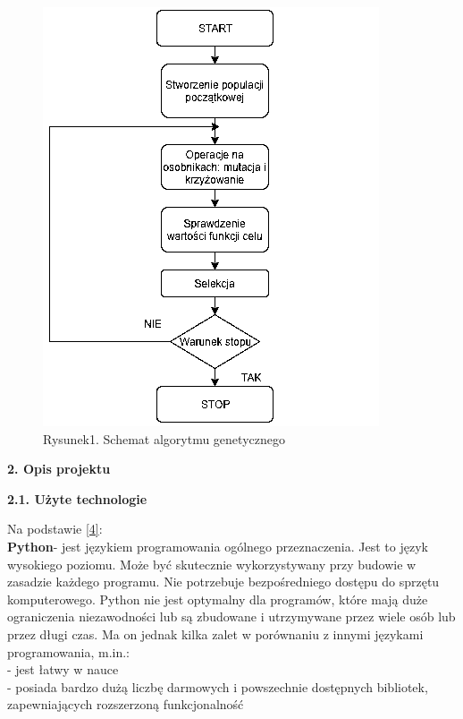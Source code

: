 \documentclass[a4paper, twoside, 12pt, justified]{article}
\begin{document}
	\vspace{10mm}
	
	
	\begin{figure}[h]
	\includegraphics[scale=0.8]{ag}
	\centering
	\\
	{Rysunek1. Schemat algorytmu genetycznego} 
	\end{figure}
	
	
	
	\newpage
	\begin{flushleft}
		\begin{large}
			\textbf{2. Opis projektu}
		\end{large}
	\end{flushleft}
	
	\vspace{5mm} %
	
	\begin{flushleft}
		\begin{large}
			\textbf{2.1. Użyte technologie}
		\end{large}
	\end{flushleft}
	\vspace{10mm} %
	
	 Na podstawie \hyperlink{python}{[4]}:\\
	 \textbf{Python}- jest językiem programowania ogólnego przeznaczenia. Jest to język wysokiego poziomu. Może być skutecznie wykorzystywany przy budowie w zasadzie każdego programu. Nie potrzebuje bezpośredniego dostępu do sprzętu komputerowego. Python nie jest optymalny dla programów, które mają duże ograniczenia niezawodności lub są zbudowane i utrzymywane przez wiele osób lub przez długi czas. Ma on jednak kilka zalet w porównaniu z innymi językami programowania, m.in.:\\
	 - jest łatwy w nauce\\ 
	 - posiada bardzo dużą liczbę darmowych i powszechnie dostępnych bibliotek, zapewniających rozszerzoną funkcjonalność\\ 
	 
\end{document}
